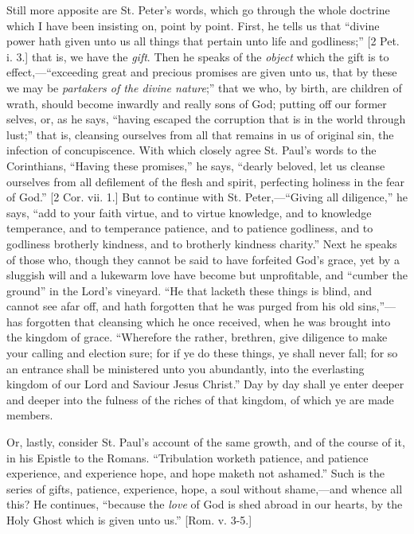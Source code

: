 Still more apposite are St. Peter's words, which go through the
whole doctrine which I have been insisting on, point by point. First,
he tells us that ``divine power hath given unto us all things that
pertain unto life and godliness;'' [2 Pet. i. 3.] that is, we have
the \emph{gift}. Then he speaks of the \emph{object} which the gift is to
effect,—``exceeding great and precious promises are given unto
us, that by these we may be \emph{partakers of the divine nature};''
that we who, by birth, are children of wrath, should become inwardly
and really sons of God; putting off our former selves, or, as he says,
``having escaped the corruption that is in the world through
lust;'' that is, cleansing ourselves from all that remains in us
of original sin, the infection of concupiscence. With which closely
agree St. Paul's words to the Corinthians, ``Having these
promises,'' he says, ``dearly beloved, let us cleanse
ourselves from all defilement of the flesh and spirit, perfecting
holiness in the fear of God.'' [2 Cor. vii. 1.] But to continue
with St. Peter,—``Giving all diligence,'' he says, ``add
to your faith virtue, and to virtue knowledge, and to knowledge
temperance, and to temperance patience, and to patience godliness, and
to godliness brotherly kindness, and to brotherly kindness
charity.'' Next he speaks of those who, though they cannot be
said
to have forfeited God's grace, yet by a sluggish will and a lukewarm
love have become but unprofitable, and ``cumber the ground''
in the Lord's vineyard. ``He that lacketh these things is blind,
and cannot see afar off, and hath forgotten that he was purged from
his old sins,''—has forgotten that cleansing which he once
received, when he was brought into the kingdom of grace.
``Wherefore the rather, brethren, give diligence to make your
calling and election sure; for if ye do these things, ye shall never
fall; for so an entrance shall be ministered unto you abundantly, into
the everlasting kingdom of our Lord and Saviour Jesus Christ.''
Day by day shall ye enter deeper and deeper into the fulness of the
riches of that kingdom, of which ye are made members.

Or, lastly, consider St. Paul's account of the same growth, and of
the course of it, in his Epistle to the Romans. ``Tribulation
worketh patience, and patience experience, and experience hope, and
hope maketh not ashamed.'' Such is the series of gifts, patience,
experience, hope, a soul without shame,—and whence all this? He
continues, ``because the \emph{love} of God is shed abroad in our hearts,
by the Holy Ghost which is given unto us.'' [Rom. v. 3-5.]

